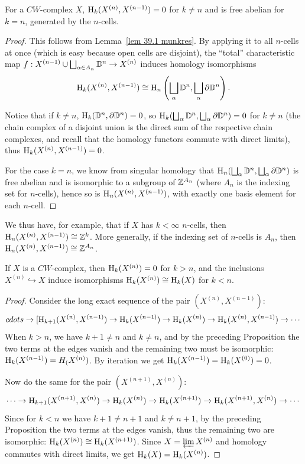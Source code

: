 \begin{prop}
    For a $CW$-complex $X$, $\mathrm{H}_k(X^{(n)},X^{(n-1)})=0$ for $k\neq n$ and is free abelian for $k=n$, generated by the $n$-cells.
\end{prop}
\begin{proof}
    This follows from Lemma~\ref{lem 39.1 munkres}. By applying it to all $n$-cells at once (which is easy because open cells are disjoint), the ``total'' characteristic map $f:X^{(n-1)}\cup \bigsqcup_{\alpha\in A_n} \mathbb{D}^n\to X^{(n)}$ induces homology isomorphisms
    \[\mathrm{H}_k(X^{(n)},X^{(n-1)})\cong \mathrm{H}_n\left(\bigsqcup_\alpha \mathbb{D}^n,\bigsqcup_\alpha \partial \mathbb{D}^n\right).\]
    
    Notice that if $k\neq n$, $\mathrm{H}_k(\mathbb{D}^n,\partial \mathbb{D}^n)=0$, so $\mathrm{H}_k(\bigsqcup_\alpha \mathbb{D}^n,\bigsqcup_\alpha \partial \mathbb{D}^n)=0$ for $k\neq n$ (the chain complex of a disjoint union is the direct sum of the respective chain complexes, and recall that the homology functors commute with direct limits), thus $\mathrm{H}_k(X^{(n)},X^{(n-1)})=0$.

    For the case $k=n$, we know from singular homology that $\mathrm{H}_n(\bigsqcup_\alpha \mathbb{D}^n,\bigsqcup_\alpha \partial \mathbb{D}^n)$ is free abelian and is isomorphic to a subgroup of $\mathbb{Z}^{A_n}$ (where $A_n$ is the indexing set for $n$-cells), hence so is $\mathrm{H}_n(X^{(n)},X^{(n-1)})$, with exactly one basis element for each $n$-cell.
\end{proof}

We thus have, for example, that if $X$ has $k<\infty$ $n$-cells, then $\mathrm{H}_n(X^{(n)},X^{(n-1)})\cong \mathbb{Z}^k$. More generally, if the indexing set of $n$-cells is $A_n$, then $\mathrm{H}_n(X^{(n)},X^{(n-1)})\cong\mathbb{Z}^{A_n}$.

\begin{prop}
    If $X$ is a $CW$-complex, then $\mathrm{H}_k(X^{(n)})=0$ for $k>n$, and the inclusions $X^{(n)}\hookrightarrow X$ induce isomorphisms $\mathrm{H}_k(X^{(n)})\cong \mathrm{H}_k(X)$ for $k<n$.
\end{prop}
\begin{proof}
    Consider the long exact sequence of the pair $(X^{(n)},X^{(n-1)})$:
    \[cdots\to [\mathrm{H}_{k+1}(X^{(n)},X^{(n-1)})\to \mathrm{H}_k(X^{(n-1)})\to \mathrm{H}_k(X^{(n)})\to \mathrm{H}_k(X^{(n)},X^{(n-1)})\to\cdots \]
    When $k>n$, we have $k+1\neq n$ and $k\neq n$, and by the preceding Proposition the two terms at the edges vanish and the remaining two must be isomorphic: $\mathrm{H}_k(X^{(n-1)})=H_(X^{(n)})$. By iteration we get $\mathrm{H}_k(X^{(n-1)})=\mathrm{H}_k(X^{(0)})=0$.
    
    Now do the same for the pair $(X^{(n+1)},X^{(n)})$:
    \[\cdots\to \mathrm{H}_{k+1}(X^{(n+1)},X^{(n)})\to \mathrm{H}_k(X^{(n)})\to \mathrm{H}_k(X^{(n+1)})\to \mathrm{H}_k(X^{(n+1)},X^{(n)})\to\cdots \]
    Since for $k<n$ we have $k+1\neq n+1$ and $k\neq n+1$, by the preceding Proposition the two terms at the edges vanish, thus the remaining two are isomorphic: $\mathrm{H}_k(X^{(n)})\cong \mathrm{H}_k(X^{(n+1)})$. Since $X=\varprojlim X^{(n)}$ and homology commutes with direct limits, we get $\mathrm{H}_k(X)=\mathrm{H}_k(X^{(n)})$.
\end{proof}

